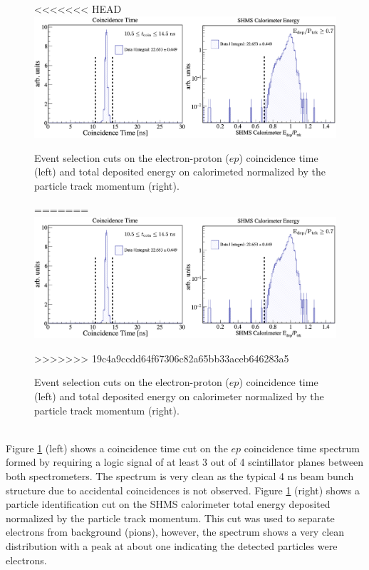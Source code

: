 \documentclass[aps, prl]{revtex4-2}  %
\begin{document}
\begin{figure}[!h]
<<<<<<< HEAD
\includegraphics[scale=0.23]{plots/coin_and_eCal_CUT_80MeV_35deg.png}
\caption{Event selection cuts on the electron-proton ($ep$) coincidence time (left) and total deposited energy on calorimeted normalized by the particle track momentum (right).}
=======
\includegraphics[scale=0.33]{plots/coin_and_eCal_CUT_80MeV_35deg.png}
\caption{Event selection cuts on the electron-proton ($ep$) coincidence time (left) and total deposited energy on calorimeter normalized by the particle track momentum (right).}
>>>>>>> 19c4a9ccdd64f67306c82a65bb33aceb646283a5
\label{fig:coin_ecal_cuts}
\end{figure}\\
\indent Figure \ref{fig:coin_ecal_cuts} (left) shows a coincidence time cut on the $ep$ coincidence time spectrum formed by requiring a logic signal of
at least 3 out of 4 scintillator planes between both spectrometers. The spectrum is very clean as the typical 4 ns beam bunch structure due to accidental
coincidences is not observed. Figure \ref{fig:coin_ecal_cuts} (right) shows a particle identification cut on the SHMS calorimeter total energy
deposited normalized by the particle track momentum. This cut was used to separate electrons from background (pions), however, the spectrum shows a very clean distribution
with a peak at about one indicating the detected particles were electrons.
\end{document}
